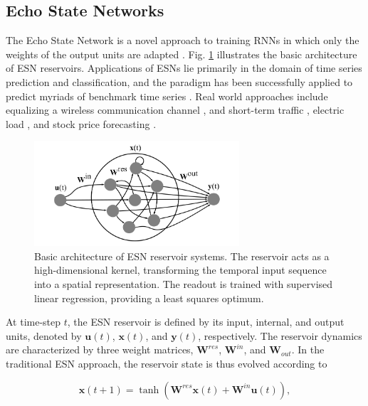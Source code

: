 \subsection{Echo State Networks}

The Echo State Network is a novel approach to training RNNs in which only the
weights of the output units are adapted \cite{jaeger_echo_2001}. Fig. \ref{esn}
illustrates the basic architecture of ESN reservoirs. Applications of ESNs lie
primarily in the domain of time series prediction and classification, and the
paradigm has been successfully applied to predict myriads of benchmark time
series \cite{goudarzi_comparative_2014, alippi_quantification_2009,
rodan_minimum_2011}. Real world approaches include equalizing a wireless
communication channel \cite{jaeger_harnessing_2004}, and short-term traffic
\cite{an_short-term_2011}, electric load \cite{song_hourly_2011}, and stock
price forecasting \cite{lin_short-term_2009}.

\begin{figure}[H]
  \centering
  \includegraphics[width=3.0in]{img/esn.png}
  \caption{
    Basic architecture of ESN reservoir systems. The reservoir acts as a
high-dimensional kernel, transforming the temporal input sequence into a spatial
representation. The readout is trained with supervised linear regression,
providing a least squares optimum.
  }
  \label{esn}
\end{figure}

At time-step $t$, the ESN reservoir is defined by its input, internal, and
output units, denoted by $\mathbf{u}(t)$, $\mathbf{x}(t)$, and $\mathbf{y}(t)$,
respectively. The reservoir dynamics are characterized by three weight matrices,
$\mathbf{W}^{res}$, $\mathbf{W}^{in}$, and $\mathbf{W}_{out}$. In the
traditional ESN approach, the reservoir state is thus evolved according to

\begin{equation}
  \mathbf{x}(t + 1) =
    \tanh(\mathbf{W}^{res}\mathbf{x}(t)
        + \mathbf{W}^{in}\mathbf{u}(t)),
  \label{xt}
\end{equation}

